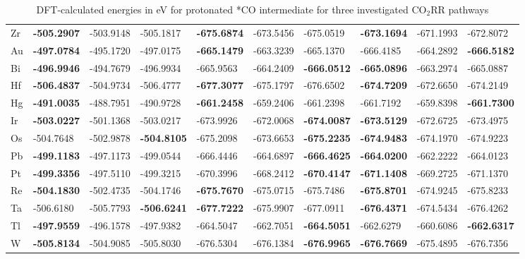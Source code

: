 \begin{table}[h]
{\begin{tabular}{*{10}{l}}
      Zr & \textbf{-505.2907} & -503.9148 & -505.1817 & \textbf{-675.6874} & -673.5456 & -675.0519 & \textbf{-673.1694} & -671.1993 & -672.8072 \\
      Au & \textbf{-497.0784} & -495.1720 & -497.0175 & \textbf{-665.1479} & -663.3239 & -665.1370 & -666.4185 & -664.2892 & \textbf{-666.5182} \\
      Bi & \textbf{-496.9946} & -494.7679 & -496.9934 & -665.9563 & -664.2409 & \textbf{-666.0512} & \textbf{-665.0896} & -663.2974 & -665.0887 \\
      Hf & \textbf{-506.4837} & -504.9734 & -506.4777 & \textbf{-677.3077} & -675.1797 & -676.6502 & \textbf{-674.7209} & -672.6650 & -674.2149 \\
      Hg & \textbf{-491.0035} & -488.7951 & -490.9728 & \textbf{-661.2458} & -659.2406 & -661.2398 & -661.7192 & -659.8398 & \textbf{-661.7300} \\
      Ir & \textbf{-503.0227} & -501.1368 & -503.0217 & -673.9926 & -672.0068 & \textbf{-674.0087} & \textbf{-673.5129} & -672.6725 & -673.4975 \\
      Os & -504.7648 & -502.9878 & \textbf{-504.8105} & -675.2098 & -673.6653 & \textbf{-675.2235} & \textbf{-674.9483} & -674.1970 & -674.9223 \\
      Pb & \textbf{-499.1183} & -497.1173 & -499.0544 & -666.4446 & -664.6897 & \textbf{-666.4625} & \textbf{-664.0200} & -662.2222 & -664.0123 \\
      Pt & \textbf{-499.3356} & -497.5110 & -499.3215 & -670.3996 & -668.2412 & \textbf{-670.4147} & \textbf{-671.1408} & -669.2725 & -671.1370 \\
      Re & \textbf{-504.1830} & -502.4735 & -504.1746 & \textbf{-675.7670} & -675.0715 & -675.7486 & \textbf{-675.8701} & -674.9245 & -675.8233 \\
      Ta & -506.6180 & -505.7793 & \textbf{-506.6241} & \textbf{-677.7222} & -675.9907 & -677.0911 & \textbf{-676.4371} & -674.5434 & -676.4262 \\
      Tl & \textbf{-497.9559} & -496.1578 & -497.9382 & -664.5047 & -662.7051 & \textbf{-664.5051} & -662.6279 & -660.6086 & \textbf{-662.6317}\\
      W  & \textbf{-505.8134} & -504.9085 & -505.8030 & -676.5304 & -676.1384 & \textbf{-676.9965} & \textbf{-676.7669} & -675.4895 & -676.7356 \\
  \end{tabular}
  }
  \caption{DFT-calculated energies in eV for protonated *CO intermediate for three investigated CO$_2$RR pathways}
  \label{si_table1:e_3_co2rr_paths}
\end{table}



